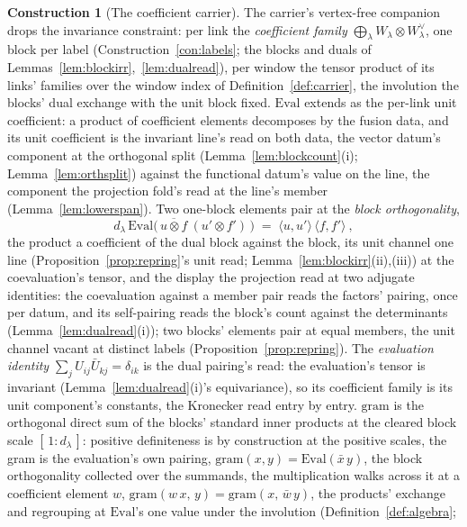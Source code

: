 \documentclass[11pt]{article}
\theoremstyle{definition}
\newtheorem{construction}{Construction}
\begin{document}
\begin{construction}[The coefficient carrier]\label{con:coeff}
The carrier's vertex-free companion drops the invariance constraint: per
link the \emph{coefficient family}
$\bigoplus_\lambda W_\lambda\otimes W_\lambda^\vee$, one block per label
(Construction~\ref{con:labels}; the blocks and duals of
Lemmas~\ref{lem:blockirr},~\ref{lem:dualread}),
per window the tensor product of its links' families over the window index
of Definition~\ref{def:carrier}, the involution the blocks' dual
exchange with the unit block fixed.
$\mathrm{Eval}$ extends as the per-link unit coefficient: a product of
coefficient elements decomposes by the fusion data, and its unit
coefficient is the invariant line's read on both data, the vector
datum's component at the orthogonal split
(Lemma~\ref{lem:blockcount}(i); Lemma~\ref{lem:orthsplit}) against the
functional datum's value on the line, the component the projection
fold's read at the line's member (Lemma~\ref{lem:lowerspan}).  Two
one-block elements pair at the \emph{block orthogonality},
\[
d_\lambda\,\mathrm{Eval}\big(\,\overline{u\otimes f}\ (u'\otimes f')\,\big)
\;=\;\langle u,u'\rangle\,\langle f,f'\rangle\ ,
\]
the product a coefficient of the dual block against the block, its
unit channel one line (Proposition~\ref{prop:repring}'s unit read;
Lemma~\ref{lem:blockirr}(ii),(iii)) at the coevaluation's tensor, and
the display the projection read at two adjugate identities: the
coevaluation against a member pair reads the factors' pairing, once
per datum, and its self-pairing reads the block's
count against the determinants (Lemma~\ref{lem:dualread}(i)); two
blocks' elements pair at equal members, the unit channel vacant at
distinct labels (Proposition~\ref{prop:repring}).  The
\emph{evaluation identity} $\sum_jU_{ij}\bar U_{kj}=\delta_{ik}$ is
the dual pairing's read: the evaluation's tensor is invariant
(Lemma~\ref{lem:dualread}(i)'s equivariance), so its coefficient
family is its unit component's constants, the Kronecker read entry by
entry.  $\mathrm{gram}$ is the orthogonal direct sum of the blocks'
standard inner products at the cleared block scale
$[\,1:d_\lambda\,]$: positive definiteness is by construction at the
positive scales, the gram is the evaluation's own pairing,
$\mathrm{gram}(x,y)=\mathrm{Eval}(\bar x\,y)$, the block orthogonality
collected over the summands, the multiplication walks across it at a
coefficient element $w$,
$\mathrm{gram}(w\,x,\,y)=\mathrm{gram}(x,\,\bar w\,y)$, the products'
exchange and regrouping at $\mathrm{Eval}$'s one value under the
involution (Definition~\ref{def:algebra};

\end{construction}
\end{document}
